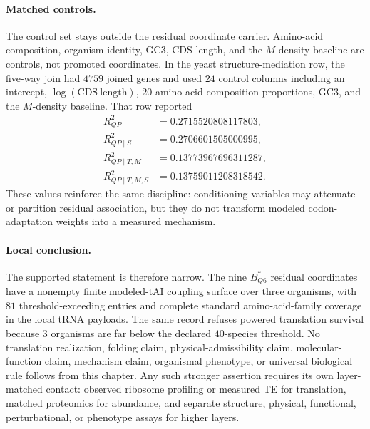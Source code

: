 \paragraph{Matched controls.}
The control set stays outside the residual coordinate carrier.  Amino-acid composition, organism identity, GC3, CDS length, and the $M$-density baseline are controls, not promoted coordinates.  In the yeast structure-mediation row, the five-way join had $4759$ joined genes and used $24$ control columns including an intercept, $\log(\mathrm{CDS\ length})$, $20$ amino-acid composition proportions, GC3, and the $M$-density baseline.  That row reported
$$
\begin{aligned}
R^2_{QP} &= 0.2715520808117803,\\
R^2_{QP\mid S} &= 0.2706601505000995,\\
R^2_{QP\mid T,M} &= 0.13773967696311287,\\
R^2_{QP\mid T,M,S} &= 0.13759011208318542.
\end{aligned}
$$
These values reinforce the same discipline: conditioning variables may attenuate or partition residual association, but they do not transform modeled codon-adaptation weights into a measured mechanism.

\paragraph{Local conclusion.}
The supported statement is therefore narrow.  The nine $B^*_{Q6}$ residual coordinates have a nonempty finite modeled-tAI coupling surface over three organisms, with $81$ threshold-exceeding entries and complete standard amino-acid-family coverage in the local tRNA payloads.  The same record refuses powered translation survival because $3$ organisms are far below the declared $40$-species threshold.  No translation realization, folding claim, physical-admissibility claim, molecular-function claim, mechanism claim, organismal phenotype, or universal biological rule follows from this chapter.  Any such stronger assertion requires its own layer-matched contact: observed ribosome profiling or measured TE for translation, matched proteomics for abundance, and separate structure, physical, functional, perturbational, or phenotype assays for higher layers.